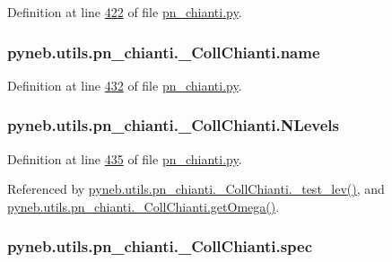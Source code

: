 Definition at line \hyperlink{pn__chianti_8py_source_l00422}{422} of file \hyperlink{pn__chianti_8py_source}{pn\-\_\-chianti.\-py}.

\hypertarget{classpyneb_1_1utils_1_1pn__chianti_1_1___coll_chianti_ac2de9885177db13b72b7f9a937cc3544}{
\subsubsection[{name}]{\setlength{\rightskip}{0pt plus 5cm}pyneb.\-utils.\-pn\-\_\-chianti.\-\_\-\-Coll\-Chianti.\-name}}\label{classpyneb_1_1utils_1_1pn__chianti_1_1___coll_chianti_ac2de9885177db13b72b7f9a937cc3544}


Definition at line \hyperlink{pn__chianti_8py_source_l00432}{432} of file \hyperlink{pn__chianti_8py_source}{pn\-\_\-chianti.\-py}.

\hypertarget{classpyneb_1_1utils_1_1pn__chianti_1_1___coll_chianti_a453595ef60eae9d063e2a24ef43002f5}{
\subsubsection[{N\-Levels}]{\setlength{\rightskip}{0pt plus 5cm}pyneb.\-utils.\-pn\-\_\-chianti.\-\_\-\-Coll\-Chianti.\-N\-Levels}}\label{classpyneb_1_1utils_1_1pn__chianti_1_1___coll_chianti_a453595ef60eae9d063e2a24ef43002f5}


Definition at line \hyperlink{pn__chianti_8py_source_l00435}{435} of file \hyperlink{pn__chianti_8py_source}{pn\-\_\-chianti.\-py}.



Referenced by \hyperlink{pn__chianti_8py_source_l00472}{pyneb.\-utils.\-pn\-\_\-chianti.\-\_\-\-Coll\-Chianti.\-\_\-test\-\_\-lev()}, and \hyperlink{pn__chianti_8py_source_l00507}{pyneb.\-utils.\-pn\-\_\-chianti.\-\_\-\-Coll\-Chianti.\-get\-Omega()}.

\hypertarget{classpyneb_1_1utils_1_1pn__chianti_1_1___coll_chianti_a665d7e8537b9ccec445bde02d78f8e93}{
\subsubsection[{spec}]{\setlength{\rightskip}{0pt plus 5cm}pyneb.\-utils.\-pn\-\_\-chianti.\-\_\-\-Coll\-Chianti.\-spec}}\label{classpyneb_1_1utils_1_1pn__chianti_1_1___coll_chianti_a665d7e8537b9ccec445bde02d78f8e93}


